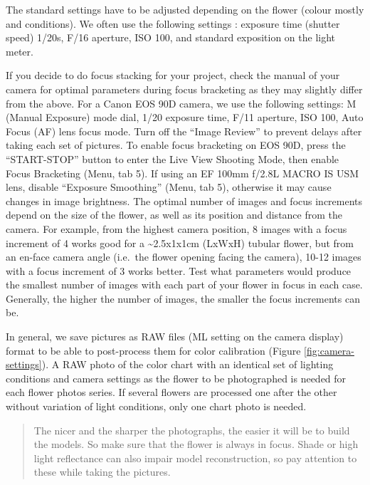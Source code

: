 \documentclass[
]{book}
\begin{document}
The standard settings have to be adjusted depending on the flower
(colour mostly and conditions). We often use the following settings :
exposure time (shutter speed) 1/20s, F/16 aperture, ISO 100, and standard
exposition on the light meter.

If you decide to do focus stacking for your project, check the manual of your camera for optimal parameters during focus bracketing as they may slightly differ from the above. For a Canon EOS 90D camera, we use the following settings: M (Manual Exposure) mode dial, 1/20 exposure time, F/11 aperture, ISO 100, Auto Focus (AF) lens focus mode. Turn off the ``Image Review'' to prevent delays after taking each set of pictures. To enable focus bracketing on EOS 90D, press the ``START-STOP'' button to enter the Live View Shooting Mode, then enable Focus Bracketing (Menu, tab 5). If using an EF 100mm f/2.8L MACRO IS USM lens, disable ``Exposure Smoothing'' (Menu, tab 5), otherwise it may cause changes in image brightness. The optimal number of images and focus increments depend on the size of the flower, as well as its position and distance from the camera. For example, from the highest camera position, 8 images with a focus increment of 4 works good for a \textasciitilde2.5x1x1cm (LxWxH) tubular flower, but from an en-face camera angle (i.e.~the flower opening facing the camera), 10-12 images with a focus increment of 3 works better. Test what parameters would produce the smallest number of images with each part of your flower in focus in each case. Generally, the higher the number of images, the smaller the focus increments can be.

In general, we save pictures as RAW files (ML
setting on the camera display) format to be able to post-process them
for color calibration (Figure \ref{fig:camera-settings}). A RAW photo of the color chart with an
identical set of lighting conditions and camera settings as the flower
to be photographed is needed for each flower photos series. If several
flowers are processed one after the other without variation of light
conditions, only one chart photo is needed.

\begin{quote}
The nicer and the sharper the photographs, the easier it will be to
build the models. So make sure that the flower is always in focus. Shade
or high light reflectance can also impair model reconstruction, so pay
attention to these while taking the pictures.
\end{quote}
\end{document}
